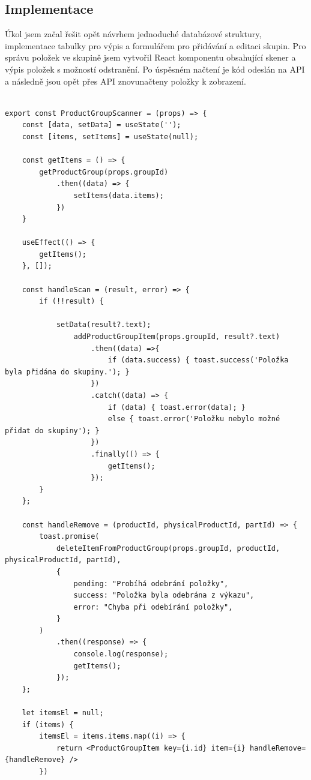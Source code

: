 \subsection{Implementace}

Úkol jsem začal řešit opět návrhem jednoduché databázové struktury, implementace tabulky pro výpis a formulářem pro přidávání a editaci skupin. Pro správu položek ve skupině jsem vytvořil React komponentu obsahující skener a výpis položek s možností odstranění. Po úspěsném načtení je kód odeslán na API a následně jsou opět přes API znovunačteny položky k zobrazení.

\begin{lstlisting}[label=src:ProductGroupScanner.js,caption={React komponenta pro správu a zobrazení položek ve skupině}]

export const ProductGroupScanner = (props) => {
    const [data, setData] = useState('');
    const [items, setItems] = useState(null);

    const getItems = () => {
        getProductGroup(props.groupId)
            .then((data) => {
                setItems(data.items);
            })
    }

    useEffect(() => {
        getItems();
    }, []);

    const handleScan = (result, error) => {
        if (!!result) {

            setData(result?.text);
                addProductGroupItem(props.groupId, result?.text)
                    .then((data) =>{
                        if (data.success) { toast.success('Položka byla přidána do skupiny.'); }
                    })
                    .catch((data) => {
                        if (data) { toast.error(data); }
                        else { toast.error('Položku nebylo možné přidat do skupiny'); }
                    })
                    .finally(() => {
                        getItems();
                    });
        }
    };

    const handleRemove = (productId, physicalProductId, partId) => {
        toast.promise(
            deleteItemFromProductGroup(props.groupId, productId, physicalProductId, partId),
            {
                pending: "Probíhá odebrání položky",
                success: "Položka byla odebrána z výkazu",
                error: "Chyba při odebírání položky",
            }
        )
            .then((response) => {
                console.log(response);
                getItems();
            });
    };

    let itemsEl = null;
    if (items) {
        itemsEl = items.items.map((i) => {
            return <ProductGroupItem key={i.id} item={i} handleRemove={handleRemove} />
        })


\end{lstlisting}
